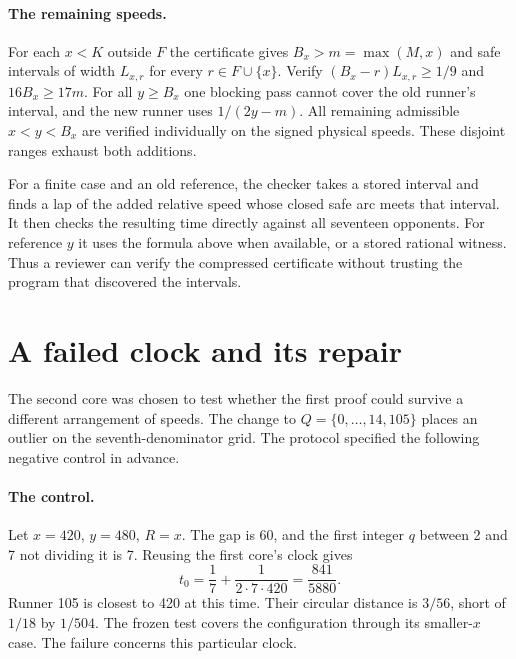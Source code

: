 \documentclass[11pt,letterpaper]{article}
\begin{document}
\paragraph{The remaining speeds.}
For each \(x<K\) outside \(F\) the certificate gives \(B_x>m=\max(M,x)\) and safe intervals of width \(L_{x,r}\) for every \(r\in F\cup\{x\}\). Verify \((B_x-r)L_{x,r}\ge1/9\) and \(16B_x\ge17m\). For all \(y\ge B_x\) one blocking pass cannot cover the old runner's interval, and the new runner uses \(1/(2y-m)\). All remaining admissible \(x<y<B_x\) are verified individually on the signed physical speeds. These disjoint ranges exhaust both additions.

For a finite case and an old reference, the checker takes a stored interval and finds a lap of the added relative speed whose closed safe arc meets that interval. It then checks the resulting time directly against all seventeen opponents. For reference \(y\) it uses the formula above when available, or a stored rational witness. Thus a reviewer can verify the compressed certificate without trusting the program that discovered the intervals.

\newpage
\section{A failed clock and its repair}
The second core was chosen to test whether the first proof could survive a different arrangement of speeds. The change to \(Q=\{0,\ldots,14,105\}\) places an outlier on the seventh-denominator grid. The protocol specified the following negative control in advance.

\paragraph{The control.}
Let \(x=420\), \(y=480\), \(R=x\). The gap is \(60\), and the first integer \(q\) between 2 and 7 not dividing it is 7. Reusing the first core's clock gives
\[
t_0=\frac17+\frac{1}{2\cdot7\cdot420}=\frac{841}{5880}.
\]
Runner 105 is closest to 420 at this time. Their circular distance is \(3/56\), short of \(1/18\) by \(1/504\). The frozen test covers the configuration through its smaller-\(x\) case. The failure concerns this particular clock.
\end{document}
